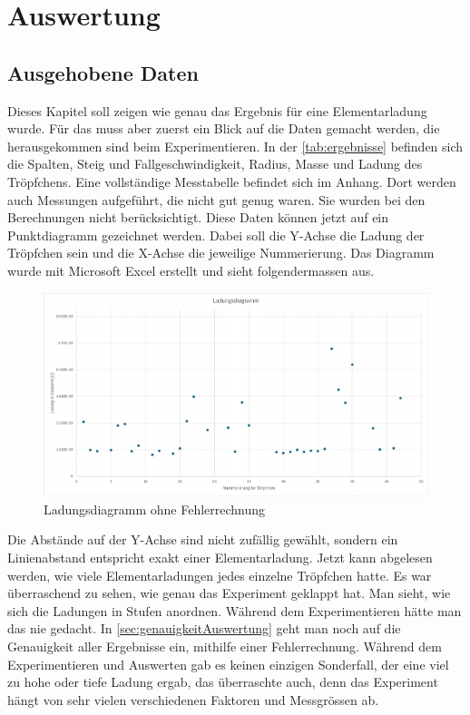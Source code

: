 \chapter{Auswertung}\label{cha:auswertung}
\section{Ausgehobene Daten}\label{sec:aushebungDaten}
Dieses Kapitel soll zeigen wie genau das Ergebnis für eine Elementarladung wurde. Für das muss aber zuerst ein Blick auf die Daten gemacht werden, die herausgekommen sind beim Experimentieren. In der \autoref{tab:ergebnisse} befinden sich die Spalten, Steig und Fallgeschwindigkeit, Radius, Masse und Ladung des Tröpfchens. Eine vollständige Messtabelle befindet sich im Anhang. Dort werden auch Messungen aufgeführt, die nicht gut genug waren. Sie wurden bei den Berechnungen nicht berücksichtigt. Diese Daten können jetzt auf ein Punktdiagramm gezeichnet werden. Dabei soll die Y-Achse die Ladung der Tröpfchen sein und die X-Achse die jeweilige Nummerierung. Das Diagramm wurde mit Microsoft Excel erstellt und sieht folgendermassen aus.

\begin{figure}[h]
	\centering
	\includegraphics[width=\textwidth]{bilder/pdf/LadungsdiagrammOhne.pdf}
	\caption{Ladungsdiagramm ohne Fehlerrechnung}
	\label{fig:ladungsdiagrammOFehlerrechnung}
\end{figure}

Die Abstände auf der Y-Achse sind nicht zufällig gewählt, sondern ein Linienabstand entspricht exakt einer Elementarladung. Jetzt kann abgelesen werden, wie viele Elementarladungen jedes einzelne Tröpfchen hatte. Es war überraschend zu sehen, wie genau das Experiment geklappt hat. Man sieht, wie sich die Ladungen in Stufen anordnen. Während dem Experimentieren hätte man das nie gedacht. In \autoref{sec:genauigkeitAuswertung} geht man noch auf die Genauigkeit aller Ergebnisse ein, mithilfe einer Fehlerrechnung. Während dem Experimentieren und Auswerten gab es keinen einzigen Sonderfall, der eine viel zu hohe oder tiefe Ladung ergab, das überraschte auch, denn das Experiment hängt von sehr vielen verschiedenen Faktoren und Messgrössen ab.

